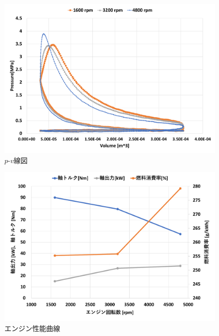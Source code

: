 \begin{figure}[h]
  \begin{center}
  \includegraphics[width=\linewidth]{img/pv_all.pdf}
  \caption{$p$-$v$線図}
  \label{pv}
\end{center}
\end{figure}

\begin{figure}[h]
  \begin{center}
  \includegraphics[width=\linewidth]{img/engine_performance.pdf}
  \caption{エンジン性能曲線}
  \label{engine}
  \end{center}
\end{figure}

